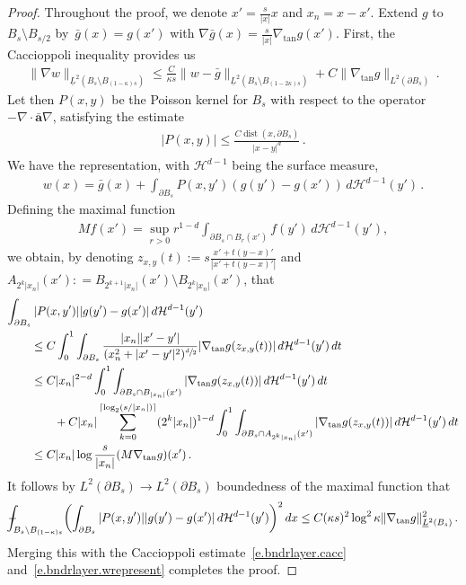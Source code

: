 \documentclass[11pt]{article} %
\numberwithin{equation}{section}
\theoremstyle{definition}
\renewcommand{\a}{\mathbf{a}}
\newcommand{\ahom}{\bar{\a}}
\DeclareMathOperator{\dist}{dist}
\def\Xint#1{\mathchoice
{\XXint\displaystyle\textstyle{#1}}%
{\XXint\textstyle\scriptstyle{#1}}%
{\XXint\scriptstyle\scriptscriptstyle{#1}}%
{\XXint\scriptscriptstyle\scriptscriptstyle{#1}}%
\!\int}
\def\XXint#1#2#3{{\setbox0=\hbox{$#1{#2#3}{\int}$}
\vcenter{\hbox{$#2#3$}}\kern-.5\wd0}}
\def\fint{\Xint-}
\begin{document}
\begin{proof}
Throughout the proof, we denote $x' = \frac{s}{|x|} x$ and $x_n = x-x'$. Extend $g$ to~$B_s\setminus B_{s/2}$ by~$\bar g(x) = g(x')$ with $\nabla \bar g(x) = \frac{s}{|x|} \nabla_{\mathrm{tan}} g(x')$.  First, the Caccioppoli inequality provides us
\begin{align}  \label{e.bndrlayer.cacc}
\| \nabla w \|_{\underline{L}^2(B_{s} \setminus B_{(1-\kappa)s})}  
\leq
\frac{C}{\kappa s} \| w - \bar g \|_{\underline{L}^2(B_{s} \setminus B_{(1-2\kappa)s})}
+
C \| \nabla_{\mathrm{tan}} g \|_{L^2(\partial B_{s})}
\,.
\end{align}
Let then $P(x,y)$ be the Poisson kernel for $B_s$ with respect to the operator $-\nabla \cdot \ahom \nabla$, satisfying the estimate
\begin{align*}  
|P(x,y)| \leq \frac{C\dist(x,\partial B_s)}{|x-y|^d}\,.
\end{align*}
We have the representation, with $\mathcal{H}^{d-1}$ being the surface measure, 
\begin{align}  \label{e.bndrlayer.wrepresent}
w(x) = \bar g(x)  
+
 \int_{\partial B_s} P(x,y') (g(y') -  g(x')) \, d\mathcal{H}^{d-1}(y') 
 \,.
\end{align}
Defining the maximal function
\begin{align*}  
M f(x') = \sup_{r>0} r^{1-d} \int_{\partial B_s \cap B_r(x')} f(y') \, d\mathcal{H}^{d-1}(y') ,
\end{align*}
we obtain, by denoting $z_{x,y}(t) := s \frac{x' + t(y-x)'}{|x' + t(y-x)'|}$ and $A_{2^k|x_n|}(x') : = B_{2^{k+1} |x_n|}(x')\setminus B_{2^{k} |x_n|}(x')$, that
\begin{align}  
\lefteqn{
\int_{\partial B_s} |P(x,y')| |g(y') -  g(x')| \, d\mathcal{H}^{d-1}(y') 
} \qquad &
\notag \\ 
&
\leq 
C \int_{0}^1 \int_{\partial B_s } 
\frac{|x_n| |x' - y'| }{(x_n^2 + |x' - y'|^2)^{\sfrac d2}} |\nabla_{\mathrm{tan}} g(z_{x,y}(t))| \, d\mathcal{H}^{d-1}(y') \, dt
\notag \\ 
& 
\leq
C |x_n|^{2-d}
\int_{0}^1 \int_{\partial B_s \cap B_{|x_n|}(x') }  |\nabla_{\mathrm{tan}} g(z_{x,y}(t))| \, d\mathcal{H}^{d-1}(y')  \, dt
\notag \\ 
&  \qquad
+
C |x_n| \sum_{k=0}^{ \lceil \log_2 (s/|x_n|) \rceil}
(2^{k} |x_n|)^{1-d}  
\int_{0}^1 \int_{\partial B_s  \cap A_{2^k|x_n|}(x')}  
 |\nabla_{\mathrm{tan}} g(z_{x,y}(t))| \, d\mathcal{H}^{d-1}(y') \, dt
 \notag \\ 
& 
\leq
C |x_n| \log \frac{s}{|x_n|} (M \nabla_{\mathrm{tan}} g)(x')
\,.
 \notag
\end{align}
It follows by $L^2(\partial B_s) \to L^2(\partial B_s)$ boundedness of the maximal function that 
\begin{align*}  
\fint_{B_s \setminus B_{(1-\kappa)s}}  
\biggl( 
\int_{\partial B_s} |P(x,y')| |g(y') -  g(x')| \, d\mathcal{H}^{d-1}(y') 
\biggr)^2 \, dx 
\leq 
C (\kappa s)^2 \log^2 \kappa  \| \nabla_{\mathrm{tan}} g \|_{\underline{L}^2(B_s)}^2
\,.
\end{align*}
Merging this with the Caccioppoli estimate~\eqref{e.bndrlayer.cacc} and~\eqref{e.bndrlayer.wrepresent} completes the proof.  
\end{proof}
\end{document}
